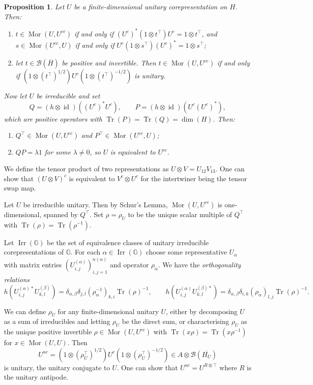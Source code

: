 \documentclass[a4paper,11pt]{article}
\theoremstyle{plain}
\newtheorem{proposition}{Proposition}[section]
\theoremstyle{remark}
\newcommand{\mc}[1]{\mathcal{#1}}
\newcommand{\id}{\operatorname{id}}
\newcommand{\G}{\mathbb{G}}
\newcommand{\tr}{\operatorname{Tr}}
\newcommand{\mor}{\operatorname{Mor}}
\newcommand{\irr}{\operatorname{Irr}}
\begin{document}
\begin{proposition}\label{prop:int_to_dbl_conj}
Let $U$ be a finite-dimensional unitary corepresentation on $H$.  Then:
\begin{enumerate}[(1)]
  \item\label{prop:int_to_dbl_conj:1} $t\in\mor(U,U^{cc})$ if and only if $(U^c)^*(1\otimes t^\top)U^c = 1\otimes t^\top$, and $s\in\mor(U^{cc},U)$ if and only if $U^c(1\otimes s^\top)(U^c)^* = 1\otimes s^\top$;
  \item\label{prop:int_to_dbl_conj:2} let $t\in\mc B(\overline H)$ be positive and invertible.  Then $t\in\mor(U,U^{cc})$ if and only if $(1\otimes (t^\top)^{1/2}) U^c (1\otimes (t^\top)^{-1/2})$ is unitary.
\end{enumerate}
Now let $U$ be irreducible and set
\[ Q = (h\otimes\id)((U^c)^* U^c), \qquad P = (h\otimes\id)(U^c (U^c)^*), \]
which are positive operators with $\tr(P)=\tr(Q)=\dim(H)$.  Then:
\begin{enumerate}[resume]
\item $Q^\top \in \mor(U,U^{cc})$ and $P^\top\in\mor(U^{cc}, U)$;
\item $QP = \lambda 1$ for some $\lambda\not=0$, so $U$ is equivalent to $U^{cc}$.
\end{enumerate}
\end{proposition}

We define the tensor product of two representations as $U \otimes V = U_{12} V_{13}$. 
One can show that $(U\otimes V)^c$ is equivalent to $V^c \otimes U^c$ for the intertwiner being the tensor swap map.

Let $U$ be irreducible unitary.  Then by Schur's Lemma, $\mor(U,U^{cc})$ is one-dimensional, spanned by $Q^\top$.  Set $\rho = \rho_U$ to be the unique scalar multiple of $Q^\top$ with $\tr(\rho) = \tr(\rho^{-1})$.

Let $\irr(\G)$ be the set of equivalence classes of unitary irreducible corepresentations of $\G$.  For each $\alpha\in\irr(\G)$ choose some representative $U_\alpha$ with matrix entries $(U^{(\alpha)}_{i,j})_{i,j=1}^{n(\alpha)}$ and operator $\rho_\alpha$.  We have the \emph{orthogonality relations}
\[ h(U^{(\alpha) *}_{i,j} U^{(\beta)}_{k,l}) = \delta_{\alpha, \beta} \delta_{j,l} (\rho_\alpha^{-1})_{k,i} \tr(\rho)^{-1},
\qquad
h(U^{(\alpha)}_{i,j} U^{(\beta) *}_{k,l}) = \delta_{\alpha, \beta} \delta_{i,k} (\rho_\alpha)_{l,j} \tr(\rho)^{-1}. \]

We can define $\rho_U$ for any finite-dimensional unitary $U$, either by decomposing $U$ as a sum of irreducibles and letting $\rho_U$ be the direct sum, or characterising $\rho_U$ as the unique positive invertible $\rho\in\mor(U,U^{cc})$ with $\tr(x\rho) = \tr(x\rho^{-1})$ for $x\in\mor(U,U)$.  Then
\[ U^{uc} = (1\otimes(\rho_U^\top)^{1/2}) U^c (1\otimes(\rho_U^\top)^{-1/2}) \in A\otimes\mc B(\overline{H_U}) \]
is unitary, the unitary conjugate to $U$.  One can show that $U^{uc} = U^{R\otimes\top}$ where $R$ is the unitary antipode.
\end{document}
